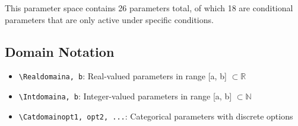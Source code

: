 \documentclass[11pt,a4paper]{article}
\begin{document}
This parameter space contains 26 parameters total, of which 18 are conditional parameters that are only active under specific conditions.

\subsection{Domain Notation}

\begin{itemize}
\item \texttt{\textbackslash Realdomain{a, b}}: Real-valued parameters in range [a, b] $\subset \mathbb{R}$
\item \texttt{\textbackslash Intdomain{a, b}}: Integer-valued parameters in range [a, b] $\subset \mathbb{N}$
\item \texttt{\textbackslash Catdomain{opt1, opt2, ...}}: Categorical parameters with discrete options
\end{itemize}
\end{document}
